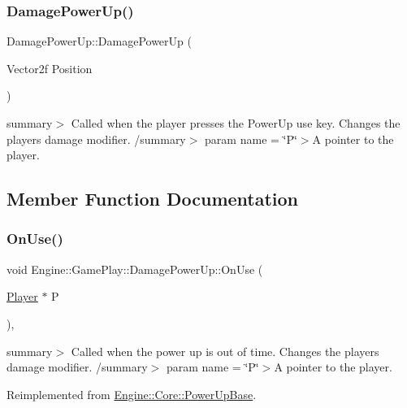 \subsubsection{\texorpdfstring{Damage\+Power\+Up()}{DamagePowerUp()}}
{\footnotesize\ttfamily Damage\+Power\+Up\+::\+Damage\+Power\+Up (\begin{DoxyParamCaption}\item[{Vector2f}]{Position }\end{DoxyParamCaption})}

summary$>$ Called when the player presses the Power\+Up use key. Changes the players damage modifier. /summary$>$ param name = \char`\"{}\+P\char`\"{}$>$A pointer to the player.

\subsection{Member Function Documentation}
\mbox{\label{class_engine_1_1_game_play_1_1_damage_power_up_abadfb61b67dd580bc98d7e120c2809cd}} 
\subsubsection{\texorpdfstring{On\+Use()}{OnUse()}}
{\footnotesize\ttfamily void Engine\+::\+Game\+Play\+::\+Damage\+Power\+Up\+::\+On\+Use (\begin{DoxyParamCaption}\item[{\hyperlink{class_engine_1_1_game_play_1_1_player}{Player} $\ast$}]{P }\end{DoxyParamCaption})\hspace{0.3cm}{\ttfamily [override]}, {\ttfamily [virtual]}}

summary$>$ Called when the power up is out of time. Changes the players damage modifier. /summary$>$ param name = \char`\"{}\+P\char`\"{}$>$A pointer to the player.

Reimplemented from \hyperlink{class_engine_1_1_core_1_1_power_up_base_a1c93516694b752a8ebc42eb181cb2b78}{Engine\+::\+Core\+::\+Power\+Up\+Base}.

\mbox{\label{class_engine_1_1_game_play_1_1_damage_power_up_a97bdd448602470ff4305b39eee866fd2}} 
